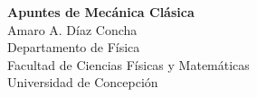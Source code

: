 \documentclass[main.tex]{subfiles}
\begin{document}
\thispagestyle{empty}
\begin{titlepage}
\centering

\vspace*{\fill}  %

{\Huge \textbf{Apuntes de Mecánica Clásica}}\\[2cm]
{\Large Amaro A. Díaz Concha}\\[1cm]
{\normalsize Departamento de Física\\
Facultad de Ciencias Físicas y Matemáticas\\
Universidad de Concepción}\\[2cm]

\vspace*{\fill}  %

\end{titlepage}
\end{document}
